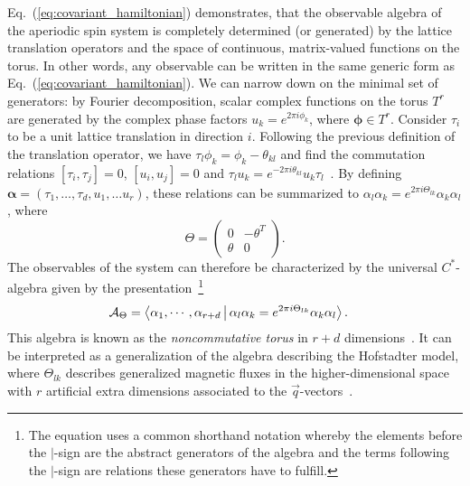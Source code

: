 \documentclass[
    10pt,
    aps,
    prr,
    twocolumn,
    floatfix,
    superscriptaddress
]{revtex4-2}
\newcommand{\SupplementalMaterial}{\cite{Note1}}
\begin{document}
Eq.~(\ref{eq:covariant_hamiltonian}) demonstrates, that the observable algebra of the aperiodic spin system is completely determined (or generated) by the lattice translation operators and the space of continuous, matrix-valued functions on the torus.
In other words, any observable can be written in the same generic form as Eq.~(\ref{eq:covariant_hamiltonian}).
We can narrow down on the minimal set of generators: 
by Fourier decomposition, scalar complex functions on the torus $T^r$ are generated by the complex phase factors $u_k = e^{ 2 \pi i \phi_k}$, where $\boldsymbol{\phi} \in T^r $.
Consider $\tau_i$ to be a unit lattice translation in direction $i$. 
Following the previous definition of the translation operator, we have $ \tau_l \phi_k = \phi_k - \theta_{kl}$  and find
the commutation relations $ [\tau_i, \tau_j] = 0 $, $ [u_i, u_j]  = 0$ and $\tau_l u_k = e^{-2 \pi i \theta_{kl}} u_k  \tau_l$~\SupplementalMaterial.
By defining $\boldsymbol{\alpha}=(\tau_1, \ldots, \tau_d, u_1,\ldots u_r )$, these relations can be summarized to $\alpha_l \alpha_k = e^{2 \pi i \Theta_{lk}} \alpha_k  \alpha_l$, where
\begin{equation}
    \Theta = \begin{pmatrix}
    0 & -\theta^T \\
    \theta & 0
    \end{pmatrix} .
\end{equation}
The observables of the system can therefore be characterized by the universal $C^\ast$-algebra given by the presentation~\footnote{The equation uses a common shorthand notation whereby the elements before the $|$-sign are the abstract generators of the algebra and the terms following the $|$-sign are relations these generators have to fulfill.}
\begin{align}
    \mathcal{A}_\Theta &= \Braket{ \alpha_1, \cdots, \alpha_{r+d}
    |  \alpha_l \alpha_k = e^{ 2 \pi i \Theta_{lk}} \alpha_k  \alpha_l }.
\end{align}
This algebra is known as the \emph{noncommutative torus} in $r+d$ dimensions~\cite{Rieffel1981, Connes1994, Prodan2019}.
It can be interpreted as a generalization of the algebra describing the Hofstadter model, where $\Theta_{lk}$ describes generalized magnetic fluxes in the higher-dimensional space with $r$ artificial extra dimensions associated to the $\vec{q}$-vectors~\cite{Kraus2013, Ma2021}.
\end{document}
